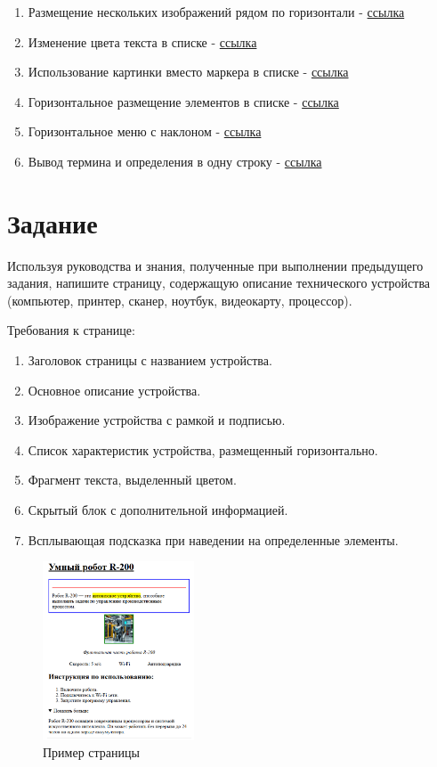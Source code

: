 \documentclass[a4paper,12pt]{extarticle}
\begin{document}
\begin{enumerate}
  \item Размещение нескольких изображений рядом по горизонтали - \href{https://htmlbook.ru/faq/kak-razmestit-neskolko-kartinok-ryadom-po-gorizontali}{ссылка}
  \item Изменение цвета текста в списке - \href{https://htmlbook.ru/faq/kak-izmenit-tsvet-teksta-v-spiske}{ссылка}
  \item Использование картинки вместо маркера в списке - \href{https://htmlbook.ru/faq/kak-vmesto-simvola-markera-ispolzovat-kartinku}{ссылка}
  \item Горизонтальное размещение элементов в списке - \href{https://htmlbook.ru/faq/kak-razmestit-elementy-spiska-gorizontalno}{ссылка}
  \item Горизонтальное меню с наклоном - \href{https://htmlbook.ru/faq/kak-sdelat-gorizontalnoe-menyu-s-naklonom}{ссылка}
  \item  Вывод термина и определения в одну строку - \href{https://htmlbook.ru/faq/kak-vyvesti-termin-i-opredelenie-v-odnu-stroku}{ссылка}
\end{enumerate}


\section{Задание}

Используя руководства и знания, полученные при выполнении предыдущего задания, напишите страницу, содержащую описание технического устройства (компьютер, принтер, сканер, ноутбук, видеокарту, процессор).

Требования к странице:
\begin{enumerate}
  \item Заголовок страницы с названием устройства.
  \item Основное описание устройства.
  \item Изображение устройства с рамкой и подписью.
  \item Список характеристик устройства, размещенный горизонтально.
  \item Фрагмент текста, выделенный цветом.
  \item Скрытый блок с дополнительной информацией.
  \item Всплывающая подсказка при наведении на определенные элементы.
\end{enumerate}

\begin{figure}[!ht]
    \centering
    \includegraphics[width=0.4\textwidth]{lab2_task2.png}
    \caption{Пример страницы}
\end{figure}
\end{document}

